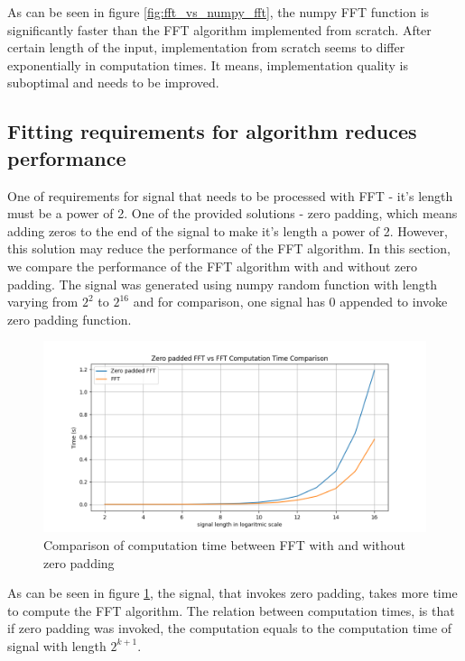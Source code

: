 \documentclass[a4paper,12pt,fleqn]{article}
\begin{document}
As can be seen in figure \ref{fig:fft_vs_numpy_fft}, the numpy FFT function is significantly
faster than the FFT algorithm implemented from scratch. After certain length of the input, implementation
from scratch seems to differ exponentially in computation times. It means, implementation quality is
suboptimal and needs to be improved.

\subsection{Fitting requirements for algorithm reduces performance}

\hspace{1 em} One of requirements for signal that needs to be processed with FFT - 
it's length must be a power of 2. One of the provided solutions - zero padding, which
means adding zeros to the end of the signal to make it's length a power of 2. However,
this solution may reduce the performance of the FFT algorithm. In this section, we compare
the performance of the FFT algorithm with and without zero padding. The signal was generated
using numpy random function with length varying from $2^2$ to $2^{16}$ and for comparison, one signal has
$0$ appended to invoke zero padding function.

\begin{figure}[H]
    \centering
    \includegraphics[width=1\textwidth]{zerop_fft_fft.png}
    \caption{Comparison of computation time between FFT with and without zero padding}
    \label{fig:zero_padding}
\end{figure}

As can be seen in figure \ref{fig:zero_padding}, the signal, that invokes zero padding, takes 
more time to compute the FFT algorithm. The relation between computation times, is that if zero padding
was invoked, the computation equals to the computation time of signal with length $2^{k+1}$.
\end{document}
